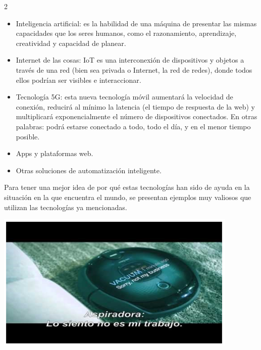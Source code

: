 \documentclass[12pt,spanish,Letterpaper,openany]{book}
\begin{document}
\begin {multicols}{2}
\begin{itemize}
\item
  Inteligencia artificial: es la habilidad de una máquina de presentar las mismas capacidades que los seres humanos, como el razonamiento, aprendizaje, creatividad y capacidad de planear.
\item
  Internet de las cosas: IoT es una interconexión de dispositivos y objetos a través de una red (bien sea privada o Internet, la red de redes), donde todos ellos podrían ser visibles e interaccionar.
\item
  Tecnología 5G: esta nueva tecnología móvil aumentará la velocidad de conexión, reducirá al mínimo la latencia (el tiempo de respuesta de la web) y multiplicará exponencialmente el número de dispositivos conectados. En otras palabras: podrá estarse conectado a todo, todo el día, y en el menor tiempo posible.
\item
  Apps y plataformas web.
\item
  Otras soluciones de automatización inteligente.
\end{itemize}

Para tener una mejor idea de por qué estas tecnologías han sido de ayuda en la situación en la que encuentra el mundo, se presentan ejemplos muy valiosos que utilizan las tecnologías ya mencionadas.

\begin {flushleft}
\noindent\begin{minipage}[c]{\columnwidth}

\begin{center}\includegraphics[width=1\linewidth]{images/tum01} \end{center}


\end{minipage}
\end{flushleft}
\end{multicols}
\end{document}
